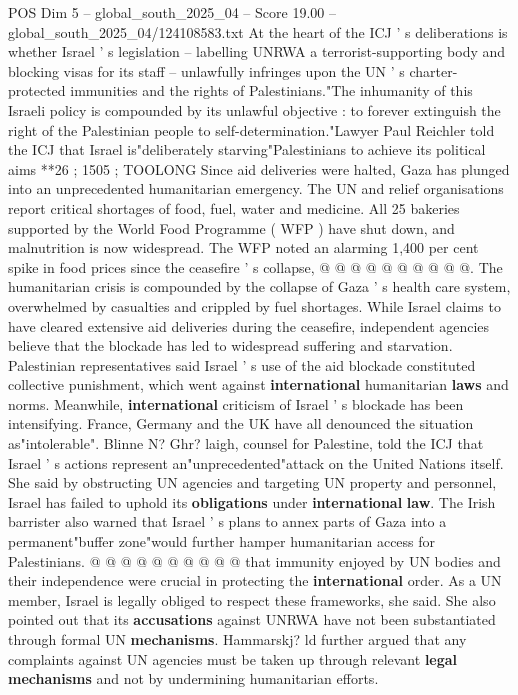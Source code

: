 \begin{textsample}{POS Dim 5 – global\_south\_2025\_04 – Score 19.00 – global\_south\_2025\_04/124108583.txt}
At the heart of the ICJ ' s deliberations is whether Israel ' s legislation -- labelling UNRWA a terrorist-supporting body and blocking visas for its staff -- unlawfully infringes upon the UN ' s charter-protected immunities and the rights of Palestinians."The inhumanity of this Israeli policy is compounded by its unlawful objective : to forever extinguish the right of the Palestinian people to self-determination."Lawyer Paul Reichler told the ICJ that Israel is"deliberately starving"Palestinians to achieve its political aims **26 ; 1505 ; TOOLONG Since aid deliveries were halted, Gaza has plunged into an unprecedented humanitarian emergency.
The UN and relief organisations report critical shortages of food, fuel, water and medicine.
All 25 bakeries supported by the World Food Programme ( WFP ) have shut down, and malnutrition is now widespread.
The WFP noted an alarming 1,400 per cent spike in food prices since the ceasefire ' s collapse, @ @ @ @ @ @ @ @ @ @.
The humanitarian crisis is compounded by the collapse of Gaza ' s health care system, overwhelmed by casualties and crippled by fuel shortages.
While Israel claims to have cleared extensive aid deliveries during the ceasefire, independent agencies believe that the blockade has led to widespread suffering and starvation.
Palestinian representatives said Israel ' s use of the aid blockade constituted collective punishment, which went against \textbf{international} humanitarian \textbf{laws} and norms.
Meanwhile, \textbf{international} criticism of Israel ' s blockade has been intensifying.
France, Germany and the UK have all denounced the situation as"intolerable".
Blinne N?
Ghr? laigh, counsel for Palestine, told the ICJ that Israel ' s actions represent an"unprecedented"attack on the United Nations itself.
She said by obstructing UN agencies and targeting UN property and personnel, Israel has failed to uphold its \textbf{obligations} under \textbf{international} \textbf{law}.
The Irish barrister also warned that Israel ' s plans to annex parts of Gaza into a permanent"buffer zone"would further hamper humanitarian access for Palestinians. @ @ @ @ @ @ @ @ @ @ that immunity enjoyed by UN bodies and their independence were crucial in protecting the \textbf{international} order.
As a UN member, Israel is legally obliged to respect these frameworks, she said.
She also pointed out that its \textbf{accusations} against UNRWA have not been substantiated through formal UN \textbf{mechanisms}.
Hammarskj? ld further argued that any complaints against UN agencies must be taken up through relevant \textbf{legal} \textbf{mechanisms} and not by undermining humanitarian efforts.

\end{textsample}
